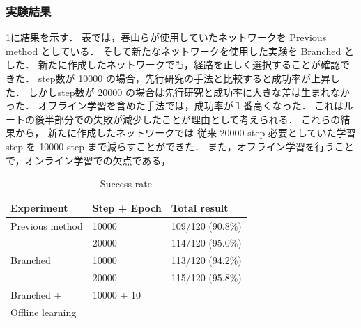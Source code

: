 \subsubsection{実験結果}
\ref{tab:result}に結果を示す．
表では，春山らが使用していたネットワークを Previous method としている．
そして新たなネットワークを使用した実験を Branched とした．
新たに作成したネットワークでも，経路を正しく選択することが確認できた．
step数が 10000 の場合，先行研究の手法と比較すると成功率が上昇した．
しかしstep数が 20000 の場合は先行研究と成功率に大きな差は生まれなかった．
オフライン学習を含めた手法では，成功率が１番高くなった．
これはルートの後半部分での失敗が減少したことが理由として考えられる．
これらの結果から， 新たに作成したネットワークでは 従来 20000 step 必要としていた学習 step を 10000 step まで減らすことができた．
また，オフライン学習を行うことで，オンライン学習での欠点である，

\begin{table}[]
  \centering
  \caption{Success rate}
  \begin{tabular}{lll}
  \hline
  Experiment         & Step + Epoch & Total result     \\ \hline
  Previous method    & 10000        & 109/120 (90.8\%) \\
                     & 20000        & 114/120 (95.0\%) \\ \hline
  Branched           & 10000        & 113/120 (94.2\%) \\ 
                     & 20000        & 115/120 (95.8\%) \\ \hline
  Branched +         & 10000 + 10   &                  \\ 
  Offline learning   &              &                  \\ \hline
  \end{tabular}
  \label{tab:result}
\end{table}